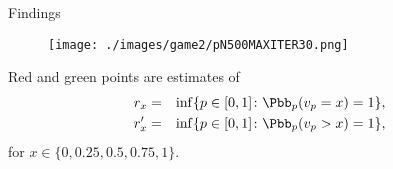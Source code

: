 \documentclass[11pt, mathserif]{beamer}
\begin{document}

    \begin{frame}{Findings}
    \vspace{-1.0cm}
        \begin{figure}[!hbt]
          \centering       
          \texttt{[image: ./images/game2/pN500MAXITER30.png]}
        \end{figure} 

        Red and green points are estimates of
        \begin{eqnarray*}
            r_x  & = & \inf\{p \in [0, 1] \colon \Pbb_p(v_p =  x) = 1\}, \\
            r_x' & = & \inf\{p \in [0, 1] \colon \Pbb_p(v_p > x) = 1\},
        \end{eqnarray*}
        for $x \in \{0, 0.25, 0.5, 0.75, 1\}$.
    \end{frame}


\end{document}
